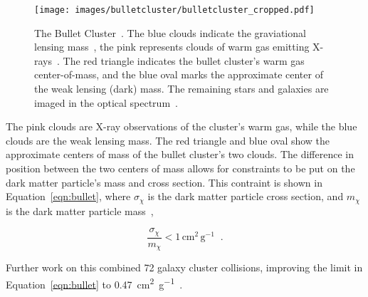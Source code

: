 \begin{figure}[ht]
  \centering
  \texttt{[image: images/bulletcluster/bulletcluster\_cropped.pdf]}
  \caption[The Bullet Cluster]{
    The Bullet Cluster~\cite{bullet_cluster_combined_image}.
    The blue clouds indicate the graviational lensing mass~\cite{bullet_cluster}, the pink represents clouds of warm gas emitting X-rays~\cite{bullet_cluster_chandramap}.
    The red triangle indicates the bullet cluster's warm gas center-of-mass, and the blue oval marks the approximate center of the weak lensing (dark) mass.
    The remaining stars and galaxies are imaged in the optical spectrum~\cite{bullet_cluster_composite}.}
  \label{fig:bullet}
\end{figure}
    
The pink clouds are X-ray observations of the cluster's warm gas, while the blue clouds are the weak lensing mass.
The red triangle and blue oval show the approximate centers of mass of the bullet cluster's two clouds.
The difference in position between the two centers of mass allows for constraints to be put on the dark matter particle's mass and cross section.
This contraint is shown in Equation~\ref{eqn:bullet}, where $\sigma_{\chi}$ is the dark matter particle cross section, and $m_{\chi}$ is the dark matter particle mass~\cite{bullet_cluster,bullet_cluster2},

\begin{equation}\label{eqn:bullet}
  \frac{\sigma_{\chi}}{m_{\chi}} < 1 \, \textrm{cm}^2 \, \textrm{g}^{-1} \;\; .
\end{equation}

Further work on this combined 72 galaxy cluster collisions, improving the limit in Equation~\ref{eqn:bullet} to \SI{0.47}{cm^2 g^{-1}}~\cite{cluster_72}.


